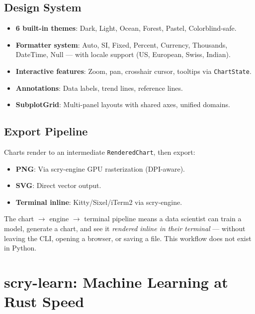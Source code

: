 \documentclass[11pt,a4paper]{article}
\begin{document}
\subsection{Design System}

\begin{itemize}[nosep]
    \item \textbf{6 built-in themes}: Dark, Light, Ocean, Forest,
          Pastel, Colorblind-safe.
    \item \textbf{Formatter system}: Auto, SI, Fixed, Percent, Currency,
          Thousands, DateTime, Null --- with locale support (US, European,
          Swiss, Indian).
    \item \textbf{Interactive features}: Zoom, pan, crosshair cursor,
          tooltips via \texttt{ChartState}.
    \item \textbf{Annotations}: Data labels, trend lines, reference
          lines.
    \item \textbf{SubplotGrid}: Multi-panel layouts with shared axes,
          unified domains.
\end{itemize}

\subsection{Export Pipeline}

Charts render to an intermediate \texttt{RenderedChart}, then export:

\begin{itemize}[nosep]
    \item \textbf{PNG}: Via scry-engine GPU rasterization (DPI-aware).
    \item \textbf{SVG}: Direct vector output.
    \item \textbf{Terminal inline}: Kitty/Sixel/iTerm2 via scry-engine.
\end{itemize}

\begin{keyinsight}
The chart $\to$ engine $\to$ terminal pipeline means a data scientist
can train a model, generate a chart, and see it \emph{rendered inline
in their terminal} --- without leaving the CLI, opening a browser, or
saving a file. This workflow does not exist in Python.
\end{keyinsight}

\section{scry-learn: Machine Learning at Rust Speed}
\end{document}
